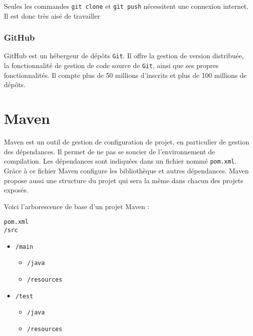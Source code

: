 Seules les commandes \texttt{git clone} et  \texttt{git push} nécessitent une connexion internet. Il est donc très aisé de travailler 

\subsubsection*{GitHub \href{https://github.com/barnabegeffroy}{\faGithub}}
GitHub est un hébergeur de dépôts \texttt{Git}. Il offre la gestion de version distribuée, la fonctionnalité de gestion de code source de \texttt{Git}, ainsi que ses propres fonctionnalités. Il compte plus de 50 millions d'inscrits et plus de 100 millions de dépôts.

\section*{Maven}
Maven est un outil de gestion de configuration de projet, en particulier de gestion des dépendances. Il permet de ne pas se soucier de l’environnement de compilation. Les dépendances sont indiquées dans un fichier nommé \texttt{pom.xml}. Grâce à ce fichier Maven configure les bibliothèque et autres dépendances. Maven propose aussi une structure du projet qui sera la même dans chacun des projets exposés. 

Voici l'arborescence de base d'un projet Maven :
\begin{center}
    \begin{minipage}[t]{3.5cm}
        \texttt{pom.xml}\\
        \texttt{/src}
        \begin{itemize}
            \item[] \texttt{/main}
                  \begin{itemize}
                      \item[] \texttt{/java}
                  \end{itemize}\vspace{-0.8ex}
                  \begin{itemize}
                      \item[] \texttt{/resources}
                  \end{itemize}\vspace{-0.8ex}
            \item[] \texttt{/test}
                  \begin{itemize}
                      \item[] \texttt{/java}
                  \end{itemize}\vspace{-0.8ex}
                  \begin{itemize}
                      \item[] \texttt{/resources}
                  \end{itemize}\vspace{-0.8ex}
        \end{itemize}
    \end{minipage}\hfill%
\end{center}